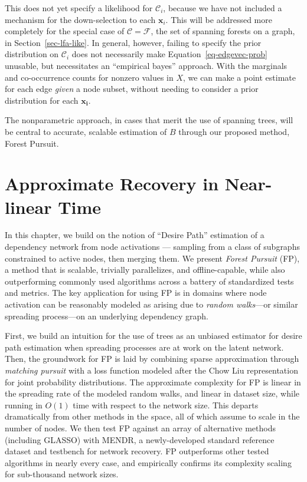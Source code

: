 \documentclass[%
	12pt,
		oneside,
		letterpaper
]{book}
\begin{document}
This does not yet specify a likelihood for \(\mathcal{C}_i\), because we
have not included a mechanism for the down-selection to each
\(\mathbf{x}_i\). This will be addressed more completely for the special
case of \(\mathcal{C}=\mathcal{F}\), the set of spanning forests on a
graph, in Section~\ref{sec-lfa-like}. In general, however, failing to
specify the prior distribution on \(\mathcal{C}_i\) does not necessarily
make Equation~\ref{eq-edgevec-prob} unusable, but necessitates an
``empirical bayes'' approach. With the marginals and co-occurrence
counts for nonzero values in \(X\), we can make a point estimate for
each edge \emph{given} a node subset, without needing to consider a
prior distribution for each \(\mathbf{x_i}\).

The nonparametric approach, in cases that merit the use of spanning
trees, will be central to accurate, scalable estimation of \(B\) through
our proposed method, Forest Pursuit.

\chapter{Approximate Recovery in Near-linear
Time}\label{approximate-recovery-in-near-linear-time}

In this chapter, we build on the notion of ``Desire Path'' estimation of
a dependency network from node activations --- sampling from a class of
subgraphs constrained to active nodes, then merging them. We present
\emph{Forest Pursuit} (FP), a method that is scalable, trivially
parallelizes, and offline-capable, while also outperforming commonly
used algorithms across a battery of standardized tests and metrics. The
key application for using FP is in domains where node activation can be
reasonably modeled as arising due to \emph{random walks}---or similar
spreading process---on an underlying dependency graph.

First, we build an intuition for the use of trees as an unbiased
estimator for desire path estimation when spreading processes are at
work on the latent network. Then, the groundwork for FP is laid by
combining sparse approximation through \emph{matching pursuit} with a
loss function modeled after the Chow Liu representation for joint
probability distributions. The approximate complexity for FP is linear
in the spreading rate of the modeled random walks, and linear in dataset
size, while running in \(O(1)\) time with respect to the network size.
This departs dramatically from other methods in the space, all of which
assume to scale in the number of nodes. We then test FP against an array
of alternative methods (including GLASSO) with MENDR, a newly-developed
standard reference dataset and testbench for network recovery. FP
outperforms other tested algorithms in nearly every case, and
empirically confirms its complexity scaling for sub-thousand network
sizes.
\end{document}
